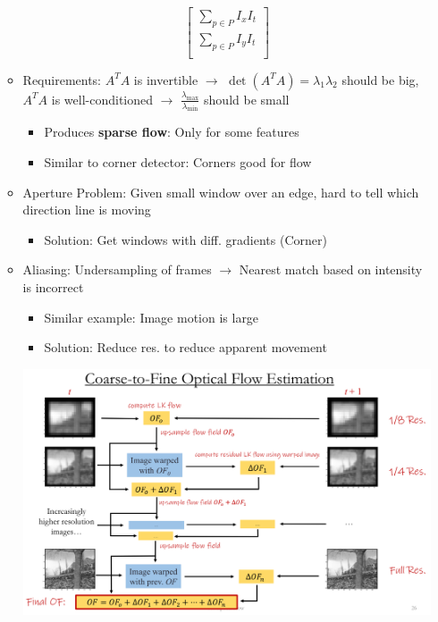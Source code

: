 \documentclass{article}
\begin{document}
\begin{multicols*}{4}
\begin{itemize}
\begin{itemize}
\[            \begin{bmatrix}
                \sum_{p \in P} I_x I_t \\
                \sum_{p \in P} I_y I_t \\
            \end{bmatrix}
        \]
        \item Requirements: $A^T A$ is invertible $\rightarrow$ $\det (A^T A) = \lambda_1 \lambda_2$ should be big, $A^T A$ is well-conditioned $\rightarrow$ $\frac{\lambda_{\text{max}}}{\lambda_{\text{min}}}$ should be small
        \begin{itemize}
            \item Produces \textbf{sparse flow}: Only for some features
            \item Similar to corner detector: Corners good for flow
        \end{itemize}
        \item Aperture Problem: Given small window over an edge, hard to tell which direction line is moving
        \begin{itemize}
            \item Solution: Get windows with diff. gradients (Corner)
        \end{itemize}
        \item Aliasing: Undersampling of frames $\rightarrow$ Nearest match based on intensity is incorrect
        \begin{itemize}
            \item Similar example: Image motion is large
            \item Solution: Reduce res. to reduce apparent movement
        \end{itemize}
        \includegraphics[scale=0.09]{coarse-to-fine-flow-estimation.jpg} 

\end{itemize}
\end{itemize}
\end{multicols*}
\end{document}

